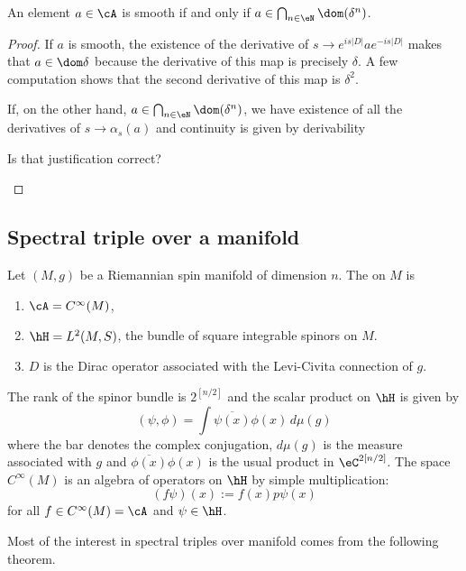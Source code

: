 \begin{proposition}
An element $a\in\cA$ is smooth if and only if $a\in\bigcap_{n\in\eN}\dom(\delta^n)$.
\end{proposition}

\begin{proof}
If $a$ is smooth, the existence of the derivative of $s\to  e^{is| D |}a e^{-is| D |}$ makes that $a\in\dom\delta$ because the derivative of this map is precisely $\delta$. A few computation shows that the second derivative of this map is $\delta^2$.

If, on the other hand, $a\in\bigcap_{n\in\eN}\dom(\delta^n)$, we have existence of all the derivatives of $s\to\alpha_s(a)$ and continuity is given by derivability
\begin{probleme}
	Is that justification correct?
\end{probleme}

\end{proof}

\subsection{Spectral triple over a manifold}

Let $(M,g)$ be a Riemannian spin manifold of dimension $n$. The  on $M$ is
\begin{enumerate}
\item $\cA= C^{\infty}(M)$,
\item $\hH=L^2(M,S)$, the bundle of square integrable spinors on $M$.
\item $D$ is the Dirac operator associated with the Levi-Civita connection of $g$.
\end{enumerate}
The rank of the spinor bundle is $2^{[n/2]}$ and the scalar product on $\hH$ is given by
\[
  (\psi,\phi)=\int \overline{ \psi(x) }\phi(x)\,d\mu(g)
\]
where the bar denotes the complex conjugation, $d\mu(g)$ is the measure associated with $g$ and $\overline{ \phi(x) }\phi(x)$ is the usual product in $\eC^{2[n/2]}$. The space $ C^{\infty}(M)$ is an algebra of operators on $\hH$ by simple multiplication:
\begin{equation}
(f\psi)(x):=f(x)p\psi(x)
\end{equation}
for all $f\in C^{\infty}(M)=\cA$ and $\psi\in\hH$.

Most of the interest in spectral triples over manifold comes from the following theorem.

